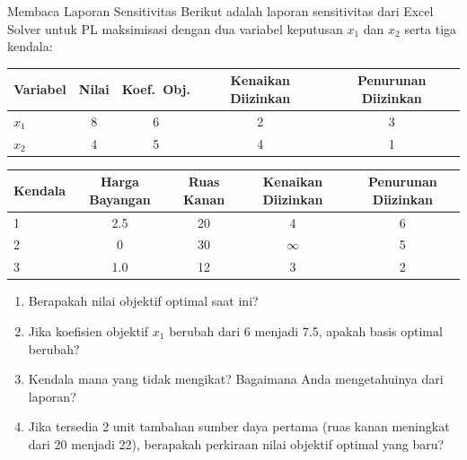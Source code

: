 \begin{ex}{Membaca Laporan Sensitivitas}{}
 Berikut adalah laporan sensitivitas dari Excel Solver untuk PL maksimisasi dengan dua variabel keputusan $x_1$ dan $x_2$ serta tiga kendala:

\begin{center}
\renewcommand{\arraystretch}{1.3}
\begin{tabular}{@{}lcccc@{}}
\toprule
\textbf{Variabel} & \textbf{Nilai} & \textbf{Koef.\ Obj.} & \textbf{Kenaikan Diizinkan} & \textbf{Penurunan Diizinkan} \\
\midrule
$x_1$ & 8 & 6 & 2 & 3 \\
$x_2$ & 4 & 5 & 4 & 1 \\
\bottomrule
\end{tabular}
\par{}\label{tab:sensitivity-LP-tab03}%

\end{center}

\begin{center}
\renewcommand{\arraystretch}{1.3}
\begin{tabular}{@{}lcccc@{}}
\toprule
\textbf{Kendala} & \textbf{Harga Bayangan} & \textbf{Ruas Kanan} & \textbf{Kenaikan Diizinkan} & \textbf{Penurunan Diizinkan} \\
\midrule
1 & 2.5 & 20 & 4 & 6 \\
2 & 0 & 30 & $\infty$ & 5 \\
3 & 1.0 & 12 & 3 & 2 \\
\bottomrule
\end{tabular}
\par{}\label{tab:sensitivity-LP-tab04}%

\end{center}

\begin{enumerate}
\item Berapakah nilai objektif optimal saat ini?
\item Jika koefisien objektif $x_1$ berubah dari 6 menjadi 7.5, apakah basis optimal berubah?
\item Kendala mana yang tidak mengikat? Bagaimana Anda mengetahuinya dari laporan?
\item Jika tersedia 2 unit tambahan sumber daya pertama (ruas kanan meningkat dari 20 menjadi 22), berapakah perkiraan nilai objektif optimal yang baru?
\end{enumerate}
\exrefs{\S\ref{sec:sensitivity-software}}
\end{ex}

